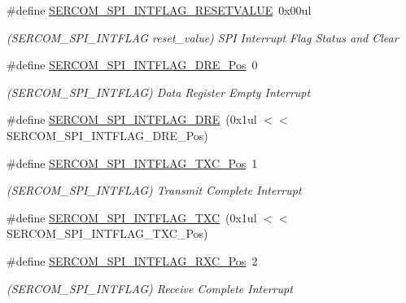 \begin{DoxyCompactItemize}
\#define \mbox{\hyperlink{group___s_a_m_d21___s_e_r_c_o_m_ga0150d7d64d32850c8f1854fe9c2ae949}{S\+E\+R\+C\+O\+M\+\_\+\+S\+P\+I\+\_\+\+I\+N\+T\+F\+L\+A\+G\+\_\+\+R\+E\+S\+E\+T\+V\+A\+L\+UE}}~0x00ul
\begin{DoxyCompactList}\small\item\em (S\+E\+R\+C\+O\+M\+\_\+\+S\+P\+I\+\_\+\+I\+N\+T\+F\+L\+AG reset\+\_\+value) S\+PI Interrupt Flag Status and Clear \end{DoxyCompactList}\item 
\#define \mbox{\hyperlink{group___s_a_m_d21___s_e_r_c_o_m_ga3fa72ba1f396c43ca489e2d4ae9f330f}{S\+E\+R\+C\+O\+M\+\_\+\+S\+P\+I\+\_\+\+I\+N\+T\+F\+L\+A\+G\+\_\+\+D\+R\+E\+\_\+\+Pos}}~0
\begin{DoxyCompactList}\small\item\em (S\+E\+R\+C\+O\+M\+\_\+\+S\+P\+I\+\_\+\+I\+N\+T\+F\+L\+AG) Data Register Empty Interrupt \end{DoxyCompactList}\item 
\#define \mbox{\hyperlink{group___s_a_m_d21___s_e_r_c_o_m_ga6b1f883e57d8906b303a2804b94caff6}{S\+E\+R\+C\+O\+M\+\_\+\+S\+P\+I\+\_\+\+I\+N\+T\+F\+L\+A\+G\+\_\+\+D\+RE}}~(0x1ul $<$$<$ S\+E\+R\+C\+O\+M\+\_\+\+S\+P\+I\+\_\+\+I\+N\+T\+F\+L\+A\+G\+\_\+\+D\+R\+E\+\_\+\+Pos)
\item 
\#define \mbox{\hyperlink{group___s_a_m_d21___s_e_r_c_o_m_gad62e87594775d6fa2eaa19b613d09101}{S\+E\+R\+C\+O\+M\+\_\+\+S\+P\+I\+\_\+\+I\+N\+T\+F\+L\+A\+G\+\_\+\+T\+X\+C\+\_\+\+Pos}}~1
\begin{DoxyCompactList}\small\item\em (S\+E\+R\+C\+O\+M\+\_\+\+S\+P\+I\+\_\+\+I\+N\+T\+F\+L\+AG) Transmit Complete Interrupt \end{DoxyCompactList}\item 
\#define \mbox{\hyperlink{group___s_a_m_d21___s_e_r_c_o_m_ga0be91a7b9fb7ea4d40a2097dc722fb35}{S\+E\+R\+C\+O\+M\+\_\+\+S\+P\+I\+\_\+\+I\+N\+T\+F\+L\+A\+G\+\_\+\+T\+XC}}~(0x1ul $<$$<$ S\+E\+R\+C\+O\+M\+\_\+\+S\+P\+I\+\_\+\+I\+N\+T\+F\+L\+A\+G\+\_\+\+T\+X\+C\+\_\+\+Pos)
\item 
\#define \mbox{\hyperlink{group___s_a_m_d21___s_e_r_c_o_m_gabec68eb91f1f30d42c26f6ee6f24cdde}{S\+E\+R\+C\+O\+M\+\_\+\+S\+P\+I\+\_\+\+I\+N\+T\+F\+L\+A\+G\+\_\+\+R\+X\+C\+\_\+\+Pos}}~2
\begin{DoxyCompactList}\small\item\em (S\+E\+R\+C\+O\+M\+\_\+\+S\+P\+I\+\_\+\+I\+N\+T\+F\+L\+AG) Receive Complete Interrupt \end{DoxyCompactList}\item 

\end{DoxyCompactItemize}
